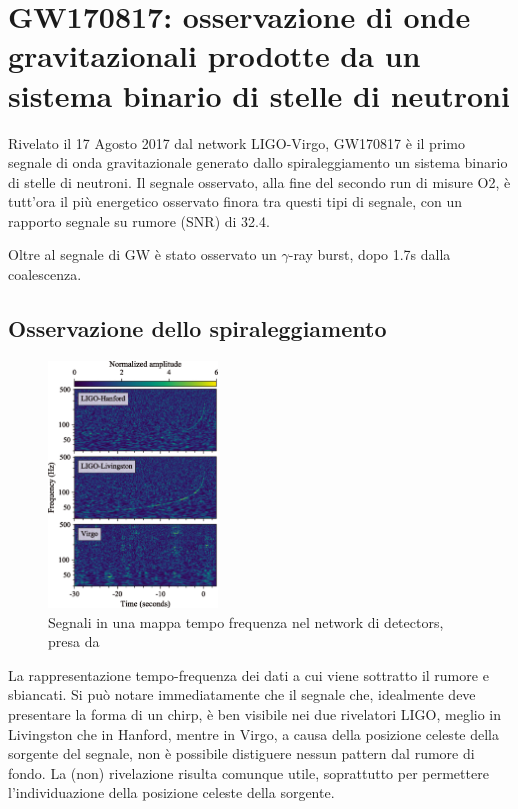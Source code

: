 \chapter[Osservazione di GW da BNS]{GW170817: osservazione di onde gravitazionali prodotte da un sistema binario di stelle di neutroni}
\label{chapter:gw170817}
Rivelato il 17 Agosto 2017 dal network LIGO-Virgo, GW170817 è il primo segnale di onda gravitazionale generato dallo spiraleggiamento un sistema binario di stelle di neutroni.
Il segnale osservato, alla fine del secondo run di misure O2, è tutt'ora il più energetico osservato finora tra questi tipi di segnale, con un rapporto segnale su rumore (SNR) di 32.4.

Oltre al segnale di GW è stato osservato un $\gamma$-ray burst, dopo 1.7s dalla coalescenza.
\section{Osservazione dello spiraleggiamento}
\label{section:osservazioneInspiralGW170817}
\begin{figure}
	\vspace{-15pt}
	\begin{center}
		\includegraphics[width=0.4\textwidth]{figures/Capitolo_2/gw170817_time_freq.png}
	\end{center}
	\vspace{-10pt}
	\caption{Segnali in una mappa tempo frequenza nel network di detectors, presa da \cite{Abbott_2017b}}
	\label{fig:osservazione_gw170817}
	\vspace{-40pt}
\end{figure}
La rappresentazione tempo-frequenza dei dati a cui viene sottratto il rumore e sbiancati. Si può notare immediatamente che il segnale che, idealmente deve presentare la forma di un chirp, è ben visibile nei due rivelatori LIGO, meglio in Livingston che in Hanford, mentre in Virgo, a causa della posizione celeste della sorgente del segnale, non è possibile distiguere nessun pattern dal rumore di fondo. La (non) rivelazione risulta comunque utile, soprattutto per permettere l'individuazione della posizione celeste della sorgente.

